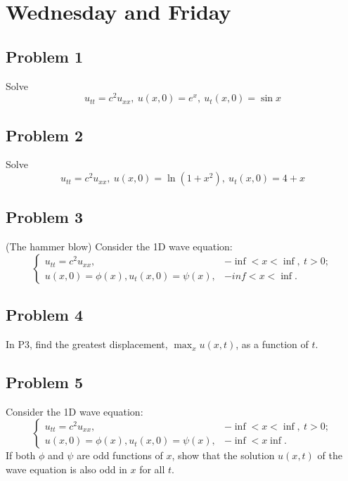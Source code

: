 \documentclass{ben}
\begin{document}
\section{Wednesday and Friday}
\subsection{Problem 1}
Solve
\[
  u_{tt} = c^2 u_{xx},\ u(x, 0) = e^{x},\ u_t(x, 0) = \sin x
\]
\subsection{Problem 2}
Solve
\[
  u_{tt} = c^2 u_{xx},\ u(x, 0) = \ln(1 + x^2),\ u_t(x, 0) = 4 + x
\]
\subsection{Problem 3}
(The hammer blow) Consider the 1D wave equation:
\[
  \begin{cases}
    u_{tt} = c^2 u_{xx}, & -\inf < x < \inf,\ t > 0;\\
    u(x, 0) = \phi(x), u_{t}(x, 0) = \psi (x), & -inf < x < \inf.
  \end{cases}
\]
\subsection{Problem 4}
In P3, find the greatest displacement, $\max_{x} u(x, t)$, as a function of $t$.
\subsection{Problem 5}
Consider the 1D wave equation:
\[
  \begin{cases}
    u_{tt} = c^2 u_{xx}, & -\inf < x < \inf,\ t > 0;\\
    u(x, 0) = \phi(x), u_{t}(x, 0) = \psi(x), & -\inf < x \inf.
  \end{cases}
\]
If both $\phi$ and $\psi$ are odd functions of $x$, show that the solution $u(x, t)$ of the wave
equation is also odd in $x$ for all $t$.
\end{document}
